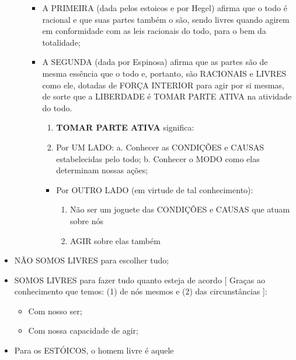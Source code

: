 \documentclass[
]{book}
\providecommand{\tightlist}{%
  \setlength{\itemsep}{0pt}\setlength{\parskip}{0pt}}
\begin{document}
\begin{itemize}
\begin{itemize}
    \begin{itemize}
    \tightlist
    \item
      A PRIMEIRA (dada pelos estoicos e por Hegel) afirma que o todo é racional e que suas partes também o são, sendo livres quando agirem em conformidade com as leis racionais do todo, para o bem da totalidade;
    \item
      A SEGUNDA (dada por Espinosa) afirma que as partes são de mesma essência que o todo e, portanto, são RACIONAIS e LIVRES como ele, dotadas de FORÇA INTERIOR para agir por si mesmas, de sorte que a LIBERDADE é TOMAR PARTE ATIVA na atividade do todo.

      \begin{enumerate}
      \def\labelenumi{\alph{enumi}.}
      \tightlist
      \item
        \textbf{TOMAR PARTE ATIVA} significa:
      \item
        Por UM LADO:
        a. Conhecer as CONDIÇÕES e CAUSAS estabelecidas pelo todo;
        b. Conhecer o MODO como elas determinam nossas ações;
      \end{enumerate}

      \begin{itemize}
      \tightlist
      \item
        Por OUTRO LADO (em virtude de tal conhecimento):

        \begin{enumerate}
        \def\labelenumi{\alph{enumi}.}
        \tightlist
        \item
          Não ser um joguete das CONDIÇÕES e CAUSAS que atuam sobre nós
        \item
          AGIR sobre elas também
        \end{enumerate}
      \end{itemize}
    \end{itemize}
  \end{itemize}
\item
  NÃO SOMOS LIVRES para escolher tudo;
\item
  SOMOS LIVRES para fazer tudo quanto esteja de acordo {[} Graças ao conhecimento que temos: (1) de nós mesmos e (2) das circunstâncias {]}:

  \begin{itemize}
  \tightlist
  \item
    Com nosso ser;
  \item
    Com nossa capacidade de agir;
  \end{itemize}
\item
  Para os ESTÓICOS, o homem livre é aquele


\end{itemize}
\end{document}
